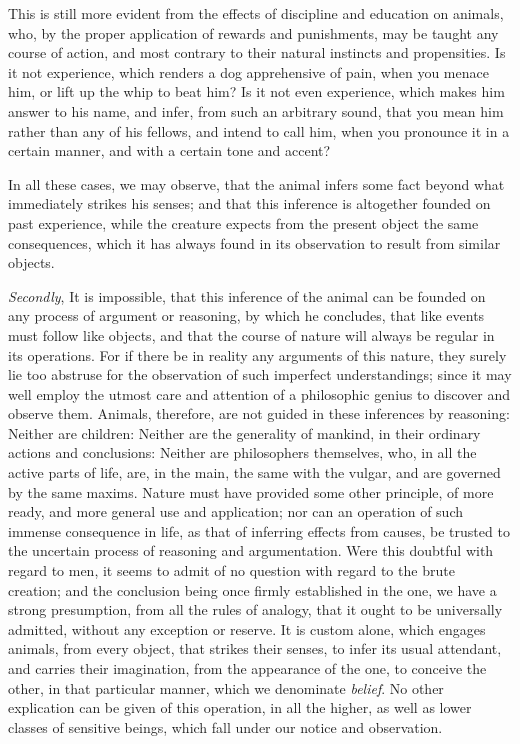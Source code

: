 \documentclass[]{article}
\begin{document}
\begin{sectionbody}
\humeparagraph  This is still more evident from the effects of discipline and education on animals, who, by the proper application of rewards and punishments, may be taught any course of action, and most contrary to their natural instincts and propensities. Is it not experience, which renders a dog apprehensive of pain, when you menace him, or lift up the whip to beat him? Is it not even experience, which makes him answer to his name, and infer, from such an arbitrary sound, that you mean him rather than any of his fellows, and intend to call him, when you pronounce it in a certain manner, and with a certain tone and accent?

\humeparagraph  In all these cases, we may observe, that the animal infers some fact beyond what immediately strikes his senses; and that this inference is altogether founded on past experience, while the creature expects from the present object the same consequences, which it has always found in its observation to result from similar objects.

\humeparagraph  \emph{Secondly}, It is impossible, that this inference of the animal can be founded on any process of argument or reasoning, by which he concludes, that like events must follow like objects, and that the course of nature will always be regular in its operations. For if there be in reality any arguments of this nature, they surely lie too abstruse for the observation of such imperfect understandings; since it may well employ the utmost care and attention of a philosophic genius to discover and observe them. Animals, therefore, are not guided in these inferences by reasoning: Neither are children: Neither are the generality of mankind, in their ordinary actions and conclusions: Neither are philosophers themselves, who, in all the active parts of life, are, in the main, the same with the vulgar, and are governed by the same maxims. Nature must have provided some other principle, of more ready, and more general use and application; nor can an operation of such immense consequence in life, as that of inferring effects from causes, be trusted to the uncertain process of reasoning and argumentation. Were this doubtful with regard to men, it seems to admit of no question with regard to the brute creation; and the conclusion being once firmly established in the one, we have a strong presumption, from all the rules of analogy, that it ought to be universally admitted, without any exception or reserve. It is custom alone, which engages animals, from every object, that strikes their senses, to infer its usual attendant, and carries their imagination, from the appearance of the one, to conceive the other, in that particular manner, which we denominate \emph{belief}. No other explication can be given of this operation, in all the higher, as well as lower classes of sensitive beings, which fall under our notice and observation.


\end{sectionbody}
\end{document}
